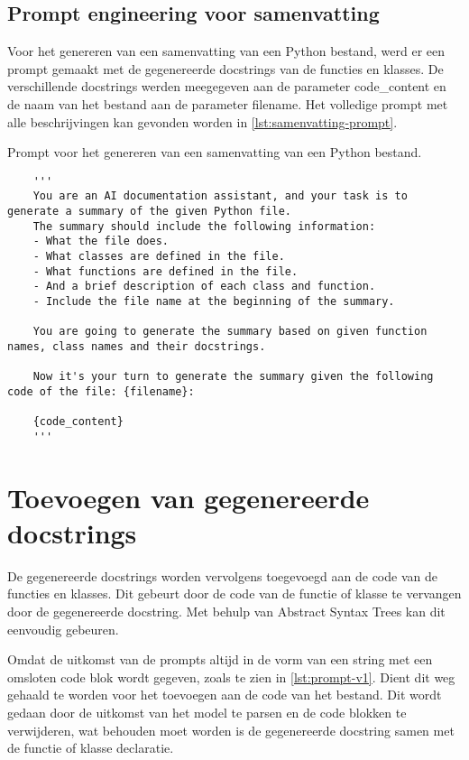 \subsection{Prompt engineering voor samenvatting}
Voor het genereren van een samenvatting van een Python bestand, werd er een prompt gemaakt met de gegenereerde docstrings van de functies en klasses.
De verschillende docstrings werden meegegeven aan de parameter code_content en de naam van het bestand aan de parameter filename.
Het volledige prompt met alle beschrijvingen kan gevonden worden in \ref{lst:samenvatting-prompt}.

\begin{listing}
    \caption{Prompt voor het genereren van een samenvatting van een Python bestand.}
    \label{lst:samenvatting-prompt}
    \begin{verbatim}
    '''
    You are an AI documentation assistant, and your task is to generate a summary of the given Python file. 
    The summary should include the following information:
    - What the file does.
    - What classes are defined in the file.
    - What functions are defined in the file.
    - And a brief description of each class and function.
    - Include the file name at the beginning of the summary.
    
    You are going to generate the summary based on given function names, class names and their docstrings.
    
    Now it's your turn to generate the summary given the following code of the file: {filename}:

    {code_content}
    '''
    \end{verbatim}
\end{listing}

\section{Toevoegen van gegenereerde docstrings}
\label{sec:bestanddocumentatie-vervangen}
De gegenereerde docstrings worden vervolgens toegevoegd aan de code van de functies en klasses.
Dit gebeurt door de code van de functie of klasse te vervangen door de gegenereerde docstring.
Met behulp van Abstract Syntax Trees kan dit eenvoudig gebeuren.

Omdat de uitkomst van de prompts altijd in de vorm van een string met een omsloten code blok wordt gegeven, zoals te zien in \ref{lst:prompt-v1}.
Dient dit weg gehaald te worden voor het toevoegen aan de code van het bestand. 
Dit wordt gedaan door de uitkomst van het model te parsen en de code blokken te verwijderen, wat behouden moet worden is de gegenereerde docstring samen met de functie of klasse declaratie.

